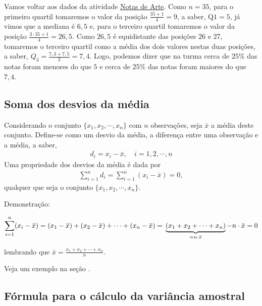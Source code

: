 Vamos voltar aos dados da atividade \hyperref[\detokenize{PE104-0:ativ-notas-de-artes}]{Notas de Arte}. Como \(n=35\), para o primeiro quartil tomaremos o valor da posição \(\frac{35+1}{4}=9\), a saber, \(\text{Q}1=5\), já vimos que a mediana é $6{,}5$ e, para o terceiro quartil tomaremos o valor da posição \(\frac{3\cdot 35+1}{4}=26{,}5\). Como $26{,}5$ é equidistante das posições 26 e 27, tomaremos o terceiro quartil como a média dos dois valores nestas duas posições, a saber, \(Q_3=\frac{7,3+7,5}{2}=7,4\). Logo, podemos dizer que na turma cerca de $25\%$ das notas foram menores do que $5$ e cerca de $25\%$ das notas foram maiores do que $7{,}4$.

\subsection{Soma dos desvios da média}

Considerando o conjunto \(\{ x_1,x_2,\cdots, x_n\}\) com \(n\) observações, seja \(\bar{x}\) a média deste conjunto.  Define-se como um desvio da média, a diferença entre uma observação e a média, a saber,
\begin{equation*}
\begin{split}d_i=x_i-\bar{x}, \quad i=1,2,\cdots, n\end{split}
\end{equation*}
Uma propriedade dos desvios da média é dada por
\begin{equation*}
\begin{split}\sum^n_{i=1}d_i=\sum^n_{i=1}(x_i-\bar{x})=0,\end{split}
\end{equation*}
qualquer que seja o conjunto \(\{ x_1,x_2,\cdots, x_n\}\).

Demonstração:

$$\displaystyle{\sum^n_{i=1}} (x_i-\bar{x})=(x_1-\bar{x})+(x_2-\bar{x})+\cdots+(x_n-\bar{x})=\\ \underbrace{(x_1+x_2+\cdots +x_n)}_{=n\cdot \bar{x}} - n\cdot \bar{x}=0$$

lembrando que \(\displaystyle\bar{x}=\frac{x_1+x_2+\cdots+x_n}{n}\).

Veja um exemplo na seção .

\subsection{Fórmula para o cálculo da variância amostral}


